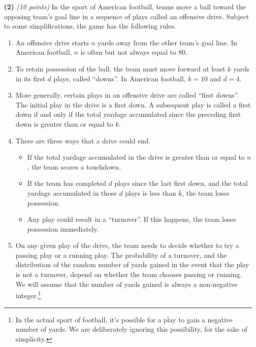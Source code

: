 \documentclass[12pt]{article}
\begin{document}
\setlength{\parindent}{0in}
\addtolength{\parskip}{0.1cm}
\setlength{\fboxrule}{.5mm}\setlength{\fboxsep}{1.2mm}
\newlength{\boxlength}\setlength{\boxlength}{\textwidth}
\addtolength{\boxlength}{-4mm}
\begin{center}
\end{center}
\vspace{5mm}

{\bf (2)} {\em (10 points)}
In the sport of American football, teams move a ball
toward the opposing team's goal line in a sequence
of plays called an offensive drive.
Subject to some simplifications, the game
has the following rules.
\begin{enumerate}
  \item An offensive drive starts $n$ yards away from
  the other team's goal line. In American football, $n$
  is often but not always equal to 80.
  \item To retain possession of the ball, the team
  must move forward at least $k$ yards in its first
  $d$ plays, called ``downs''. In American football,
  $k=10$ and $d=4$.
  \item More generally, certain plays in an offensive
  drive are called ``first downs''. The initial play in
  the drive is a first down. A subsequent play is
  called a first down if and only if the total
  yardage accumulated since the preceding first down
  is greater than or equal to $k$.
  \item There are three ways that a drive could end.
  \begin{itemize}
    \item If the total yardage accumulated in the drive
    is greater than or equal to $n$, the team scores a
    touchdown.
    \item If the team has completed $d$ plays
    since the last first down, and the total
    yardage accumulated in those $d$ plays
    is less than $k$, the team loses possession.
    \item Any play could result in a ``turnover''.
    If this happens, the team loses possession
    immediately.
  \end{itemize}
  \item On any given play of the drive, the team
  needs to decide whether to try a passing play
  or a running play. The probability of a turnover,
  and the distribution of the random number of
  yards gained in the event that the play is not
  a turnover, depend on whether the team chooses
  passing or running. We will assume that the
  number of yards gained is always a non-negative
  integer.\footnote{In the actual sport of football,
  it's possible for a play to gain a negative number
  of yards. We are deliberately ignoring this
  possibility, for the sake of simplicity.}
\end{enumerate}
\end{document}
